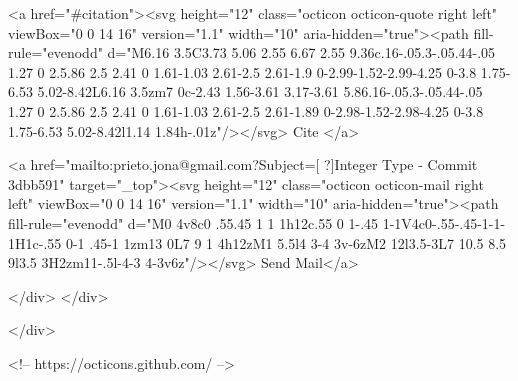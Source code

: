      <a  href="#citation"><svg height="12" class="octicon octicon-quote right left" viewBox="0 0 14 16" version="1.1" width="10" aria-hidden="true"><path fill-rule="evenodd" d="M6.16 3.5C3.73 5.06 2.55 6.67 2.55 9.36c.16-.05.3-.05.44-.05 1.27 0 2.5.86 2.5 2.41 0 1.61-1.03 2.61-2.5 2.61-1.9 0-2.99-1.52-2.99-4.25 0-3.8 1.75-6.53 5.02-8.42L6.16 3.5zm7 0c-2.43 1.56-3.61 3.17-3.61 5.86.16-.05.3-.05.44-.05 1.27 0 2.5.86 2.5 2.41 0 1.61-1.03 2.61-2.5 2.61-1.89 0-2.98-1.52-2.98-4.25 0-3.8 1.75-6.53 5.02-8.42l1.14 1.84h-.01z"/></svg> Cite
      </a>

      <a href="mailto:prieto.jona@gmail.com?Subject=[ ?]Integer Type - Commit 3dbb591" target="_top"><svg height="12" class="octicon octicon-mail right left" viewBox="0 0 14 16" version="1.1" width="10" aria-hidden="true"><path fill-rule="evenodd" d="M0 4v8c0 .55.45 1 1 1h12c.55 0 1-.45 1-1V4c0-.55-.45-1-1-1H1c-.55 0-1 .45-1 1zm13 0L7 9 1 4h12zM1 5.5l4 3-4 3v-6zM2 12l3.5-3L7 10.5 8.5 9l3.5 3H2zm11-.5l-4-3 4-3v6z"/></svg> Send Mail</a>

    </div>
  </div>

</div>

<!-- https://octicons.github.com/ -->





